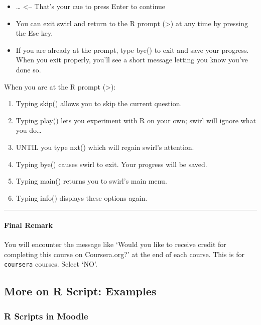 \documentclass[
]{article}
\providecommand{\tightlist}{%
  \setlength{\itemsep}{0pt}\setlength{\parskip}{0pt}}
\begin{document}
\begin{itemize}
\item
  \ldots{} \textless-- That's your cue to press Enter to continue
\item
  You can exit swirl and return to the R prompt (\textgreater) at any
  time by pressing the Esc key.
\item
  If you are already at the prompt, type bye() to exit and save your
  progress. When you exit properly, you'll see a short message letting
  you know you've done so.
\end{itemize}

When you are at the R prompt (\textgreater):

\begin{enumerate}
\def\labelenumi{\arabic{enumi}.}
\tightlist
\item
  Typing skip() allows you to skip the current question.
\item
  Typing play() lets you experiment with R on your own; swirl will
  ignore what you do\ldots{}
\item
  UNTIL you type nxt() which will regain swirl's attention.
\item
  Typing bye() causes swirl to exit. Your progress will be saved.
\item
  Typing main() returns you to swirl's main menu.
\item
  Typing info() displays these options again.
\end{enumerate}

\begin{center}\rule{0.5\linewidth}{0.5pt}\end{center}

\hypertarget{final-remark}{%
\paragraph{Final Remark}\label{final-remark}}

You will encounter the message like `Would you like to receive credit
for completing this course on Coursera.org?' at the end of each course.
This is for \texttt{coursera} courses. Select `NO'.

\hypertarget{more-on-r-script-examples}{%
\subsection{More on R Script:
Examples}\label{more-on-r-script-examples}}

\hypertarget{r-scripts-in-moodle}{%
\subsubsection{R Scripts in Moodle}\label{r-scripts-in-moodle}}
\end{document}
